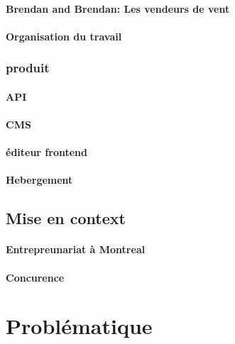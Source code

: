 \documentclass[11pt, a4paper ]{report}
\begin{document}
				\subsubsection{Brendan and Brendan: Les vendeurs de vent}

				\subsubsection{Organisation du travail}

			\subsection{produit}


				\subsubsection{API}
				\subsubsection{CMS}
				\subsubsection{éditeur frontend}
				\subsubsection{Hebergement}

		\section{Mise en context} %
			

			\subsubsection{Entrepreunariat à Montreal}

			\subsubsection{Concurence}


	\chapter{Problématique} %
\end{document}
